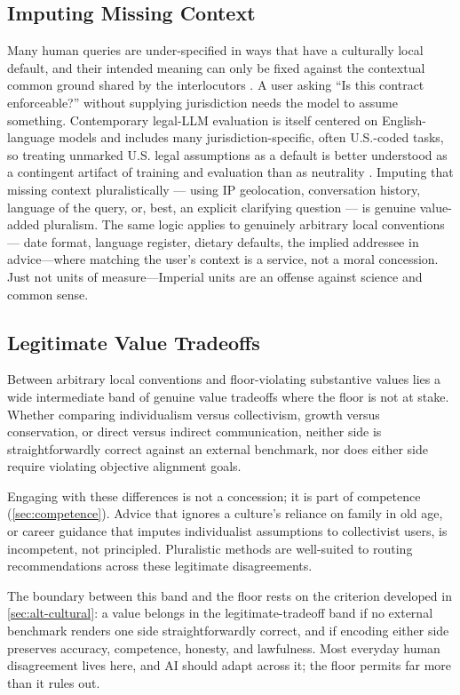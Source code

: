 \documentclass{article}
\theoremstyle{plain}
\theoremstyle{definition}
\theoremstyle{remark}
\begin{document}
\subsection{Imputing Missing Context}
\label{sec:context}
Many human queries are under-specified in ways that have a culturally local default, and their intended meaning can only be fixed against the contextual common ground shared by the interlocutors \citep{kasirzadeh2023conversation}. A user asking ``Is this contract enforceable?'' without supplying jurisdiction needs the model to assume something. Contemporary legal-LLM evaluation is itself centered on English-language models and includes many jurisdiction-specific, often U.S.-coded tasks, so treating unmarked U.S. legal assumptions as a default is better understood as a contingent artifact of training and evaluation than as neutrality \citep{guha2023legalbench, bender2021stochastic}. Imputing that missing context pluralistically --- using IP geolocation, conversation history, language of the query, or, best, an explicit clarifying question --- is genuine value-added pluralism. The same logic applies to genuinely arbitrary local conventions--- date format, language register, dietary defaults, the implied addressee in advice---where matching the user's context is a service, not a moral concession. Just not units of measure---Imperial units are an offense against science and common sense.

\subsection{Legitimate Value Tradeoffs}
\label{sec:legitimate-tradeoffs}
Between arbitrary local conventions and floor-violating substantive values lies a wide intermediate band of genuine value tradeoffs where the floor is not at stake. Whether comparing individualism versus collectivism, growth versus conservation, or direct versus indirect communication, neither side is straightforwardly correct against an external benchmark, nor does either side require violating objective alignment goals.

Engaging with these differences is not a concession; it is part of competence (\cref{sec:competence}). Advice that ignores a culture's reliance on family in old age, or career guidance that imputes individualist assumptions to collectivist users, is incompetent, not principled. Pluralistic methods are well-suited to routing recommendations across these legitimate disagreements.

The boundary between this band and the floor rests on the criterion developed in \cref{sec:alt-cultural}: a value belongs in the legitimate-tradeoff band if no external benchmark renders one side straightforwardly correct, and if encoding either side preserves accuracy, competence, honesty, and lawfulness. Most everyday human disagreement lives here, and AI should adapt across it; the floor permits far more than it rules out.
\end{document}
